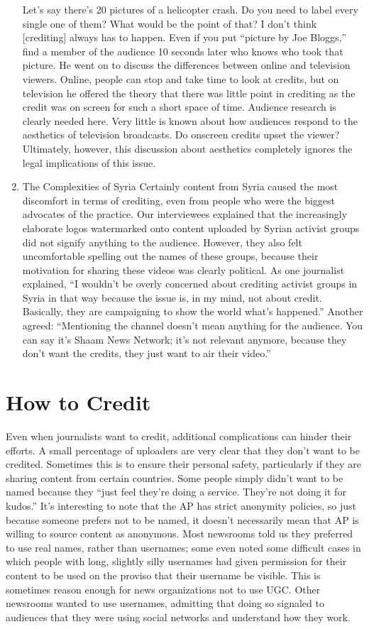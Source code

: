 \documentclass[symmetric, notoc, nobib]{towcenter-book}
\begin{document}
\begin{enumerate}
Let's say there's 20 pictures of a helicopter crash. Do you need to label
every single one of them? What would be the point of that? I don't
think [crediting] always has to happen. Even if you put ``picture by Joe
Bloggs,'' find a member of the audience 10 seconds later who knows
who took that picture.
He went on to discuss the differences between online and television viewers.
Online, people can stop and take time to look at credits, but on television
he offered the theory that there was little point in crediting as the
credit was on screen for such a short space of time.
Audience research is clearly needed here. Very little is known about how
audiences respond to the aesthetics of television broadcasts. Do onscreen
credits upset the viewer? Ultimately, however, this discussion about aesthetics
completely ignores the legal implications of this issue.
\item The Complexities of Syria
Certainly content from Syria caused the most discomfort in terms of crediting,
even from people who were the biggest advocates of the practice. Our
interviewees explained that the increasingly elaborate logos watermarked
onto content uploaded by Syrian activist groups did not signify anything
to the audience. However, they also felt uncomfortable spelling out the
names of these groups, because their motivation for sharing these videos
was clearly political.
As one journalist explained, ``I wouldn't be overly concerned about crediting
activist groups in Syria in that way because the issue is, in my mind,
not about credit. Basically, they are campaigning to show the world
what's happened.''
Another agreed: ``Mentioning the channel doesn't mean anything for the
audience. You can say it's Shaam News Network; it's not relevant anymore,
because they don't want the credits, they just want to air their video.''
\end{enumerate}

\section{How to Credit}
Even when journalists want to credit, additional complications can hinder
their efforts. A small percentage of uploaders are very clear that they don't
want to be credited. Sometimes this is to ensure their personal safety, particularly
if they are sharing content from certain countries. Some people simply
didn't want to be named because they ``just feel they're doing a service.
They're not doing it for kudos.'' It's interesting to note that the AP has strict
anonymity policies, so just because someone prefers not to be named, it
doesn't necessarily mean that AP is willing to source content as anonymous.
Most newsrooms told us they preferred to use real names, rather than usernames;
some even noted some difficult cases in which people with long,
slightly silly usernames had given permission for their content to be used on
the proviso that their username be visible. This is sometimes reason enough
for news organizations not to use UGC. Other newsrooms wanted to use
usernames, admitting that doing so signaled to audiences that they were
using social networks and understand how they work.
\end{document}
